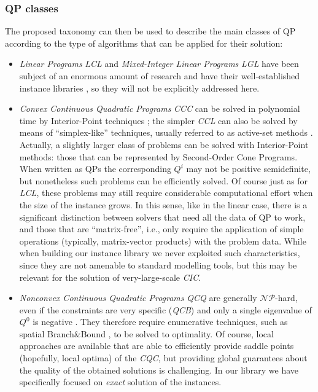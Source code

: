 \subsubsection{QP classes}\label{ssec:classes}

The proposed taxonomy can then be used to describe the main classes of QP according to the type of algorithms that can be applied for their solution:
%
\begin{itemize}
 \item \emph{Linear Programs} \textit{LCL} and \emph{Mixed-Integer Linear Programs} \textit{LGL} have been subject of an enormous amount of research and have their well-established instance libraries \cite{Koch2011}, so they will not be explicitly addressed here.
 \item \emph{Convex Continuous Quadratic Programs} \textit{CCC} can be solved in polynomial time by Interior-Point techniques \cite{Wright97}; the simpler \textit{CCL} can also be solved by means of ``simplex-like'' techniques, usually referred to as active-set methods \cite{Dost09}. Actually, a slightly larger class of problems can be solved with Interior-Point methods: those that can be represented by Second-Order Cone Programs. When written as QPs the corresponding $Q^i$ may not be positive semidefinite, but nonetheless such problems can be efficiently solved. Of course just as for \textit{LCL}, these problems may still require considerable computational effort when the size of the instance grows. In this sense, like in the linear case, there is a significant distinction between solvers that need all the data of QP to work, and those that are ``matrix-free'', i.e., only require the application of simple operations (typically, matrix-vector products) with the problem data. While when building our instance library we never exploited such characteristics, since they are not amenable to standard modelling tools, but this may be relevant for the solution of very-large-scale \textit{CIC}.
 \item \emph{Nonconvex Continuous Quadratic Programs} \textit{QCQ} are generally $\mathcal{NP}$-hard, even if the constraints are very specific (\textit{QCB}) and only a single eigenvalue of $Q^0$ is negative \cite{Hemmecke2010}. They therefore require enumerative techniques, such as spatial Branch\&Bound \cite{FV90,BeLeLiMaWa08}, to be solved to optimality. Of course, local approaches are available that are able to efficiently provide saddle points (hopefully, local optima) of the \textit{CQC}, but providing global guarantees about the quality of the obtained solutions is challenging. In our library we have specifically focused on  \emph{exact} solution of the instances.

\end{itemize}
